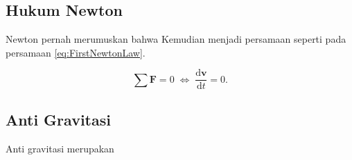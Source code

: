 \subsection{Hukum Newton}

Newton \citep{Newton1687} pernah merumuskan bahwa \lipsum[19]
Kemudian menjadi persamaan seperti pada persamaan \ref{eq:FirstNewtonLaw}.

\begin{equation}
  \label{eq:FirstNewtonLaw}
  \sum \mathbf{F} = 0\; \Leftrightarrow\; \frac{\mathrm{d} \mathbf{v} }{\mathrm{d}t} = 0.
\end{equation}

\subsection{Anti Gravitasi}

Anti gravitasi merupakan \lipsum[20]
